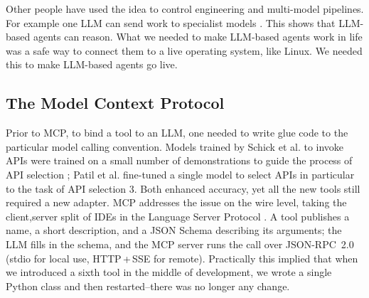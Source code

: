 \documentclass[conference]{IEEEtran}
\begin{document}
Other people have used the idea to control engineering \cite{zahedifar2025llmagent, guo2024controlagent} and multi-model pipelines. For example one LLM can send work to specialist models \cite{shen2023hugginggpt, lewis2020rag}. This shows that LLM-based agents can reason. What we needed to make LLM-based agents work in life was a safe way to connect them to a live operating system, like Linux. We needed this to make LLM-based agents go live.


\subsection{The Model Context Protocol}
Prior to MCP, to bind a tool to an LLM, one needed to write glue code to the particular model calling convention.  Models trained by Schick et al. to invoke APIs were trained on a small number of demonstrations to guide the process of API selection \cite{schick2023toolformer}; Patil et al. fine-tuned a single model to select APIs in particular to the task of API selection 3. Both enhanced accuracy, yet all the new tools still required a new adapter. MCP \cite{anthropic2024mcp} addresses the issue on the wire level, taking the client,server split of IDEs in the Language Server Protocol \cite{microsoft2024lsp}. A tool publishes a name, a short description, and a JSON Schema describing its arguments; the LLM fills in the schema, and the MCP server runs the call over JSON-RPC~2.0 \cite{jsonrpc2013spec} (stdio for local use, HTTP\,+\,SSE for remote). Practically this implied that when we introduced a sixth tool in the middle of development, we wrote a single Python class and then restarted--there was no longer any change.
\end{document}
